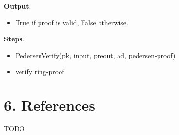 \documentclass[
]{article}
\providecommand{\tightlist}{%
  \setlength{\itemsep}{0pt}\setlength{\parskip}{0pt}}
\begin{document}
\textbf{Output}:

\begin{itemize}
\tightlist
\item
  True if proof is valid, False otherwise.
\end{itemize}

\textbf{Steps}:

\begin{itemize}
\tightlist
\item
  PedersenVerify(pk, input, preout, ad, pedersen-proof)
\item
  verify ring-proof
\end{itemize}

\hypertarget{references}{%
\section{6. References}\label{references}}

TODO
\end{document}

